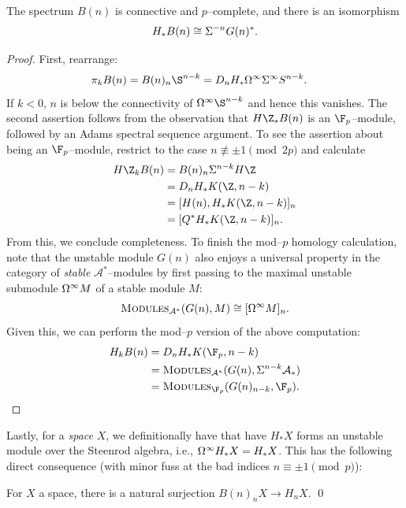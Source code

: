 \begin{lemma}
The spectrum \(B(n)\) is connective and \(p\)--complete, and there is an isomorphism \[H_* B(n) \cong \Sigma^{-n} G(n)^*.\]
\end{lemma}
\begin{proof}
First, rearrange:
\begin{align*}
\pi_k B(n) & = B(n)_n \S^{n-k} = D_n H_* \Loops^\infty \Susp^\infty S^{n-k}.
\end{align*}
If \(k < 0\), \(n\) is below the connectivity of \(\Loops^\infty \S^{n-k}\) and hence this vanishes.
The second assertion follows from the observation that \(H\Z_* B(n)\) is an \(\F_p\)--module, followed by an Adams spectral sequence argument.
To see the assertion about being an \(\F_p\)--module, restrict to the case \(n \not\equiv \pm 1 \pmod{2p}\) and calculate
\begin{align*}
H\Z_k B(n) & = B(n)_n \Susp^{n-k} H\Z \\
& = D_n H_* K(\Z, n-k) \\
& = [H(n), H_* K(\Z, n-k)]_n \\
& = [Q^* H_* K(\Z, n-k)]_n.
\end{align*}
From this, we conclude completeness.
To finish the mod--\(p\) homology calculation, note that the unstable module \(G(n)\) also enjoys a universal property in the category of \emph{stable} \(\mathcal A^*\)--modules by first passing to the maximal unstable submodule \(\Omega^\infty M\) of a stable module \(M\): \[\normalfont\textsc{Modules}_{\mathcal A^*}(G(n), M) \cong [\Omega^\infty M]_n.\]
Given this, we can perform the mod--\(p\) version of the above computation:
\begin{align*}
H_k B(n) & = D_n H_* K(\F_p, n-k) \\
& = \CatOf{Modules}_{\mathcal A^*}(G(n), \Susp^{n-k} \mathcal A_*) \\
& = \CatOf{Modules}_{\F_p}(G(n)_{n-k}, \F_p). \qedhere
\end{align*}
\end{proof}

Lastly, for a \emph{space} \(X\), we definitionally have that have \(H_* X\) forms an unstable module over the Steenrod algebra, i.e., \(\Omega^\infty H_* X = H_* X\).
This has the following direct consequence (with minor fuss at the bad indices \(n \equiv \pm 1 \pmod p\)):

\begin{corollary}
For \(X\) a space, there is a natural surjection \(B(n)_n X \to H_n X\). \qed
\end{corollary}


